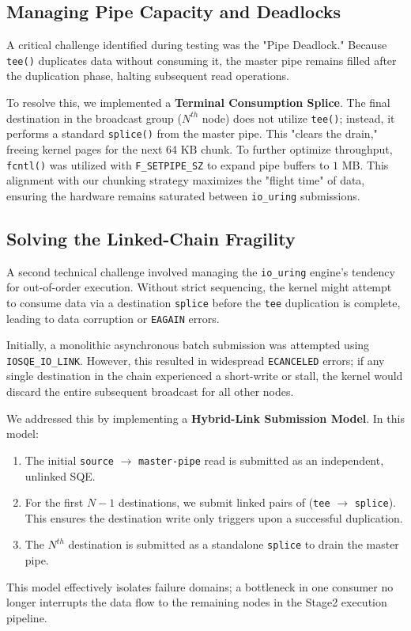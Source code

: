 \documentclass[
	a4paper,
	10pt,
	unnumberedsections,
	twoside, 
]{LTJournalArticle}
\begin{document}
\subsection{Managing Pipe Capacity and Deadlocks}
A critical challenge identified during testing was the "Pipe Deadlock." Because \texttt{tee()} duplicates data without consuming it, the master pipe remains filled after the duplication phase, halting subsequent read operations. 

To resolve this, we implemented a \textbf{Terminal Consumption Splice}. The final destination in the broadcast group ($N^{th}$ node) does not utilize \texttt{tee()}; instead, it performs a standard \texttt{splice()} from the master pipe. This "clears the drain," freeing kernel pages for the next $64\text{ KB}$ chunk. To further optimize throughput, \texttt{fcntl()} was utilized with \texttt{F\_SETPIPE\_SZ} to expand pipe buffers to $1\text{ MB}$. This alignment with our chunking strategy maximizes the "flight time" of data, ensuring the hardware remains saturated between \texttt{io\_uring} submissions.

\subsection{Solving the Linked-Chain Fragility}
A second technical challenge involved managing the \texttt{io\_uring} engine's tendency for out-of-order execution. Without strict sequencing, the kernel might attempt to consume data via a destination \texttt{splice} before the \texttt{tee} duplication is complete, leading to data corruption or \texttt{EAGAIN} errors.

Initially, a monolithic asynchronous batch submission was attempted using \texttt{IOSQE\_IO\_LINK}. However, this resulted in widespread \texttt{ECANCELED} errors; if any single destination in the chain experienced a short-write or stall, the kernel would discard the entire subsequent broadcast for all other nodes. 

We addressed this by implementing a \textbf{Hybrid-Link Submission Model}. In this model:
\begin{enumerate}
	\item The initial \texttt{source} $\rightarrow$ \texttt{master-pipe} read is submitted as an independent, unlinked SQE.
	\item For the first $N-1$ destinations, we submit linked pairs of (\texttt{tee} $\rightarrow$ \texttt{splice}). This ensures the destination write only triggers upon a successful duplication.
	\item The $N^{th}$ destination is submitted as a standalone \texttt{splice} to drain the master pipe. 
\end{enumerate}
This model effectively isolates failure domains; a bottleneck in one consumer no longer interrupts the data flow to the remaining nodes in the Stage2 execution pipeline.
\end{document}
